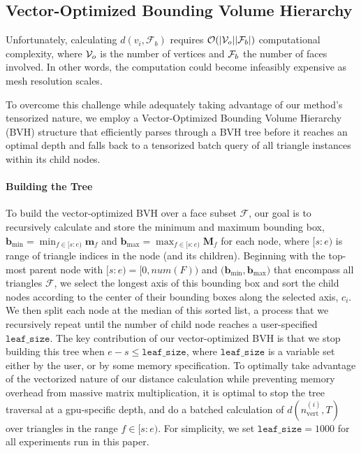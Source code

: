 \subsection{Vector-Optimized Bounding Volume Hierarchy}
\label{subsec:bvh}

Unfortunately, calculating $d(v_i, \mathcal{F}_b)$ requires $\mathcal{O}(|\mathcal{V}_o||\mathcal{F}_b|)$ computational complexity, where $\mathcal{V}_o$ is the number of vertices and $\mathcal{F}_b$ the number of faces involved. In other words, the computation could become infeasibly expensive as mesh resolution scales.

To overcome this challenge while adequately taking advantage of our method's tensorized nature, we employ a  Vector-Optimized Bounding Volume Hierarchy (BVH) structure that efficiently parses through a BVH tree before it reaches an optimal depth and falls back to a tensorized batch query of all triangle instances within its child nodes. 
\paragraph{Building the Tree}
To build the vector-optimized BVH over a face subset $\mathcal{F}$, our goal is to recursively calculate and store the minimum and maximum bounding box, $\mathbf{b}_{\min}=\min_{f\in[s:e)}\mathbf{m}_f$ and 
$\mathbf{b}_{\max}=\max_{f\in[s:e)}\mathbf{M}_f$
for each node, where $[s:e)$ is range of triangle indices in the node (and its children). Beginning with the top-most parent node with $[s:e)=[0,num(F))$ and ${(\mathbf{b}_{\min}, \mathbf{b}_{\max}})$ that encompass all triangles $\mathcal{F}$, we select the longest axis of this bounding box and sort the child nodes according to the center of their bounding boxes along the selected axis, ${c_i}$. We then split each node at the median of this sorted list, a process that we recursively repeat until the number of child node reaches a user-specified $\texttt{leaf\_size}$. The key contribution of our vector-optimized BVH is that we stop building this tree when $e-s\le\texttt{leaf\_size}$, where $\texttt{leaf\_size}$ is a variable set either by the user, or by some memory specification. To optimally take advantage of the vectorized nature of our distance calculation while preventing memory overhead from massive matrix multiplication, it is optimal to stop the tree traversal at a gpu-specific depth, and do a batched calculation of $d(n_{\text{vert}}^{(i)}, T)$ over triangles in the range ${f\in[s:e)}$. For simplicity, we set $\texttt{leaf\_size}=1000$ for all experiments run in this paper. 

